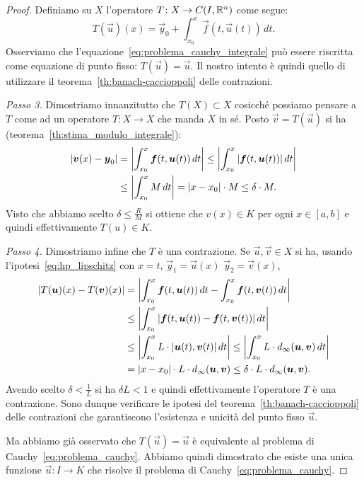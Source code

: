 \begin{proof}
  Definiamo su $X$ l'operatore $T\colon X \to C(I,{\mathbb R}^n)$ come segue:
  \[
    T(\vec u)(x) = \vec y_0 + \int_{x_0}^x \vec f(t,\vec u(t))\, dt.
  \]
  Osserviamo che l'equazione~\eqref{eq:problema_cauchy_integrale} può essere riscritta
  come equazione di punto fisso: $T(\vec u) = \vec u$. 
  Il nostro intento è quindi quello di utilizzare il teorema~\ref{th:banach-caccioppoli} delle contrazioni.

  \emph{Passo 3.}
  Dimostriamo innanzitutto che $T(X)\subset X$ cosicché possiamo pensare a $T$ come ad un operatore 
  $T\colon X\to X$ che manda $X$ in sé.
  Posto $\vec v = T(\vec u)$ si ha
  (teorema~\ref{th:stima_modulo_integrale}):
  \begin{align*}
    {\left|\boldsymbol v(x)-\boldsymbol y_0\right|} 
    &= {\left|\int_{x_0}^x \boldsymbol f(t, \boldsymbol u(t))\, dt\right|} 
    \le {\left|\int_{x_0}^x {\left|\boldsymbol f(t,\boldsymbol u(t))\right|}\, dt\right|}\\
    &\le {\left|\int_{x_0}^x M\, dt \right|} 
    = {\left|x-x_0\right|}\cdot M \le \delta \cdot M.
  \end{align*}
Visto che abbiamo scelto $\delta \le \frac{R}{M}$ si ottiene che $v(x) \in K$ per ogni $x\in [a,b]$ 
e quindi effettivamente $T(u)\in K$.

\emph{Passo 4.}
Dimostriamo infine che $T$ è una contrazione. 
Se $\vec u,\vec v\in X$ si ha, usando l'ipotesi~\eqref{eq:hp_lipschitz} con $x=t$, $\vec y_1=\vec u(x)$
$\vec y_2 = \vec v(x)$,
\begin{align*}
{\left|T(\boldsymbol u)(x)-T(\boldsymbol v)(x)\right|} 
  &= {\left|\int_{x_0}^x \boldsymbol f(t,\boldsymbol u(t))\, dt - \int_{x_0}^x \boldsymbol f(t,\boldsymbol v(t))\, dt\right|} \\
  &\le {\left|\int_{x_0}^x {\left|\boldsymbol f(t,\boldsymbol u(t))- \boldsymbol f(t,\boldsymbol v(t))\right|}\, dt \right|}\\
  &\le {\left|\int_{x_0}^x L\cdot  {\left|\boldsymbol u(t), \boldsymbol v(t)\right|}\, dt\right|} 
  \le {\left|\int_{x_0}^x L \cdot d_\infty(\boldsymbol u, \boldsymbol v)\, dt\right|}  \\
  &={\left|x-x_0\right|}\cdot L \cdot d_\infty(\boldsymbol u,\boldsymbol v)
  \le \delta \cdot L \cdot d_\infty(\boldsymbol u,\boldsymbol v).
\end{align*}
Avendo scelto $\delta < \frac{1}{L}$ si ha $\delta L<1$ e quindi effettivamente l'operatore $T$ 
è una contrazione.
Sono dunque verificare le ipotesi del teorema~\ref{th:banach-caccioppoli} delle contrazioni
che garantiscono l'esistenza e unicità del punto fisso $\vec u$.

Ma abbiamo già osservato che $T(\vec u) = \vec u$ è equivalente al problema di Cauchy~\eqref{eq:problema_cauchy}.
Abbiamo quindi dimostrato che esiste una unica funzione $\vec u\colon I \to K$ 
che risolve il problema di Cauchy~\eqref{eq:problema_cauchy}.
\end{proof}

